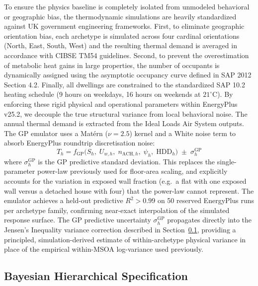 \documentclass[11pt, a4paper, twocolumn, numbers]{elsarticle}
\begin{document}
To ensure the physics baseline is completely isolated from unmodeled behavioral or geographic bias, the thermodynamic simulations are heavily standardized against UK government engineering frameworks. First, to eliminate geographic orientation bias, each archetype is simulated across four cardinal orientations (North, East, South, West) and the resulting thermal demand is averaged in accordance with CIBSE TM54 guidelines. Second, to prevent the overestimation of metabolic heat gains in large properties, the number of occupants is dynamically assigned using the asymptotic occupancy curve defined in SAP 2012 Section 4.2. Finally, all dwellings are constrained to the standardized SAP 10.2 heating schedule (9 hours on weekdays, 16 hours on weekends at \(21^\circ\mathrm{C}\)). By enforcing these rigid physical and operational parameters within EnergyPlus v25.2, we decouple the true structural variance from local behavioral noise. The annual thermal demand is extracted from the Ideal Loads Air System outputs. The GP emulator
uses a Mat\'{e}rn (\(\nu=2.5\)) kernel and a White noise term to absorb EnergyPlus
roundtrip discretisation noise:
\begin{equation}
T_h = f_{\mathrm{GP}}\bigl(S_h,\; U_{w,h},\; n_{\mathrm{ACH},h},\; \psi_h,\; \text{HDD}_h\bigr)
      \;\pm\; \sigma^{\mathrm{GP}}_h
\end{equation}
where \(\sigma^{\mathrm{GP}}_h\) is the GP predictive standard deviation. This replaces
the single-parameter power-law previously used for floor-area scaling, and explicitly
accounts for the variation in exposed wall fraction (e.g.\ a flat with one exposed
wall versus a detached house with four) that the power-law cannot represent. The
emulator achieves a held-out predictive \(R^2 > 0.99\) on 50 reserved EnergyPlus
runs per archetype family, confirming near-exact interpolation of the simulated
response surface. The GP predictive uncertainty \(\sigma^{\mathrm{GP}}_h\) propagates
directly into the Jensen's Inequality variance correction described in Section~\ref{bayesian-hierarchical-specification},
providing a principled, simulation-derived estimate of within-archetype physical
variance in place of the empirical within-MSOA log-variance used previously.


\subsection{Bayesian Hierarchical
Specification}\label{bayesian-hierarchical-specification}
\end{document}
